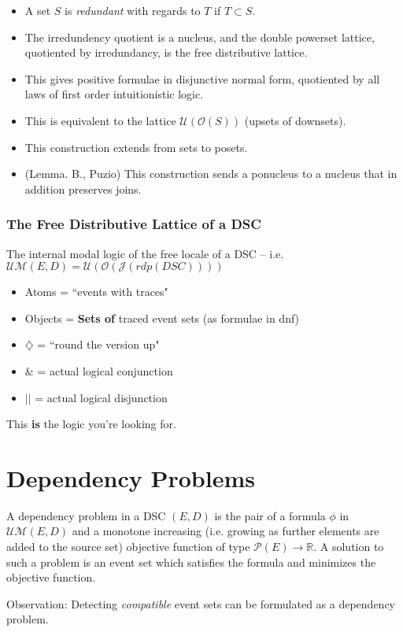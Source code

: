 \documentclass{beamer}
\newcommand{\UMc}{\mathcal{UM}}
\newcommand{\Oc}{\mathcal{O}}
\newcommand{\Pc}{\mathcal{P}}
\newcommand{\Ucc}{\mathcal{U}}
\newcommand{\Jc}{\mathcal{J}}
\newcommand{\Dia}{\diamondsuit}
\begin{document}
\begin{frame}
\begin{itemize}
\item A set \(S\) is \textit{redundant} with regards to \(T\) if \(T \subset S\).
\item The irredundency quotient is a nucleus, and the double powerset lattice, quotiented by irredundancy, is the free distributive lattice.
\item This gives positive formulae in disjunctive normal form, quotiented by all laws of first order intuitionistic logic.
\item This is equivalent to the lattice \(\Ucc(\Oc(S))\) (upsets of downsets).
\item This construction extends from sets to posets.
\item (Lemma. B., Puzio) This construction sends a ponucleus to a nucleus that in addition preserves joins.
\end{itemize}
\end{frame}

\begin{frame}
\frametitle{The Free Distributive Lattice of a DSC}
The internal modal logic of the free locale of a DSC -- i.e. \(\UMc(E,D)  = \Ucc(\Oc(\Jc(rdp(DSC))))\)

\begin{itemize}
\item Atoms = ``events with traces"
\item Objects = \textbf{Sets of} traced event sets (as formulae in dnf)
\item \(\Dia\) =  ``round the version up"
\item \(\&\) = actual logical conjunction
\item \(||\) = actual logical disjunction
\end{itemize}

This \textbf{is} the logic you're looking for.

\end{frame}

\section{Dependency Problems}
\begin{frame}
\begin{definition}
A dependency problem in a DSC \((E,D)\) is the pair of a formula \(\phi\) in \(\UMc(E,D)\) and a monotone increasing (i.e. growing as further elements are added to the source set) objective function of type \(\Pc(E) \rightarrow \mathbb{R}\). A solution to such a problem is an event set which satisfies the formula and minimizes the objective function.
\end{definition}

Observation: Detecting \textit{compatible} event sets can be formulated as a dependency problem.
\end{frame}
\end{document}
